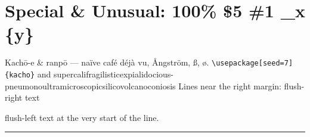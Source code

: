 \documentclass[11pt]{article}
\begin{document}
\section*{Special \& Unusual: 100\% \$5 \#1 \_x \{y\}}
Kach\=o-e \& ranp\=o — na\"ive caf\'e d\'ej\`a vu, \AA ngstr\"om, \ss, \o.
\texttt{\textbackslash usepackage[seed=7]\{kacho\}} and
supercalifragilisticexpialidocious-pneumonoultramicroscopicsilicovolcanoconiosis
Lines near the right margin: \hfill flush-right text\par
\noindent flush-left text at the very start of the line.\par
\hfill\rule{\linewidth}{0.4pt}\par
\end{document}
